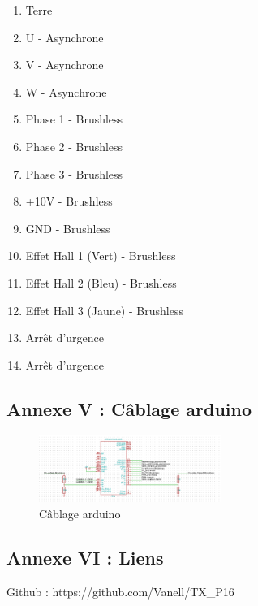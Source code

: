 \documentclass[11pt]{article}
\begin{document}
\begin{enumerate}
	\item Terre
	\item U - Asynchrone
	\item V - Asynchrone
	\item W - Asynchrone
	\item Phase 1 - Brushless
	\item Phase 2 - Brushless
	\item Phase 3 - Brushless
	\item +10V - Brushless
	\item GND - Brushless
	\item Effet Hall 1 (Vert) - Brushless
	\item Effet Hall 2 (Bleu) - Brushless
	\item Effet Hall 3 (Jaune) - Brushless
	\item Arrêt d'urgence
	\item Arrêt d'urgence
\end{enumerate}

\newpage

\subsection{Annexe V : Câblage arduino}

\begin{figure}[!h]
    \centering
    \includegraphics[angle=90,width=225px]{arduino_cablage.png}
    \caption{Câblage arduino}
\end{figure}
\FloatBarrier
\newpage

\subsection{Annexe VI : Liens}

Github : https://github.com/Vanell/TX\_P16
\end{document}
